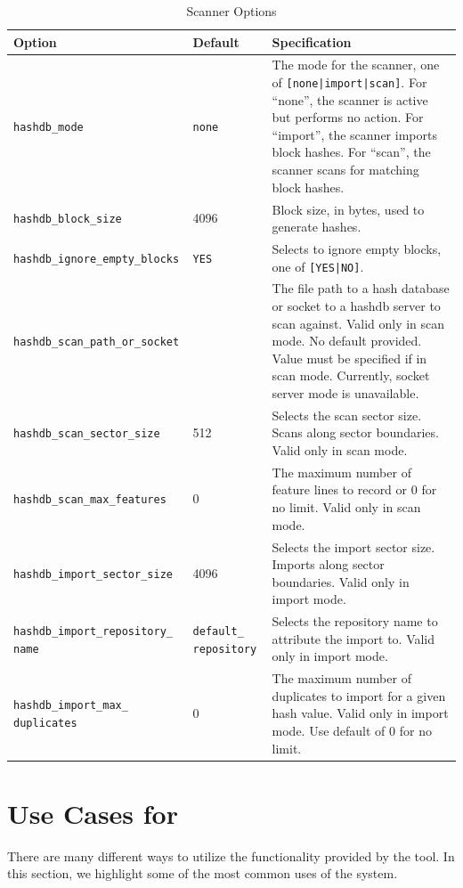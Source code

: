 \documentclass[11pt,fleqn]{article} %
\begin{document}
\begin{table}[!ht]

\centering
\caption{\bulk \hdb Scanner Options}
\label{tab:hashdbScannerUsage}
\begin{tabular}{|p{5 cm}|p{2.0 cm}|p{6.5 cm}|}
\hline \hline
\textbf{Option} & \textbf{Default} & \textbf{Specification} \\
\hline
\verb+hashdb_mode+ & \verb+none+ & The mode for the scanner, one of \verb+[none|import|scan]+. For ``none'', the scanner is active but performs no action. For ``import'', the scanner imports block hashes. For ``scan'', the scanner scans for matching block hashes.\\
\hline
\verb+hashdb_block_size+ &4096 & Block size, in bytes, used to generate hashes.\\
\hline
\verb+hashdb_ignore_empty_blocks+ & \verb+YES+ &Selects to ignore empty blocks,  one of \verb+[YES|NO]+.\\
\hline
\verb+hashdb_scan_path_or_socket+ & & The file path to a hash database or socket to a hashdb server to scan against.  Valid only in scan mode. No default provided. Value must be specified if in scan mode.  Currently, socket server mode is unavailable.\\
\hline
\verb+hashdb_scan_sector_size+ & 512 &Selects the scan sector size.  Scans along sector boundaries.  Valid only in scan mode.\\
\hline
\verb+hashdb_scan_max_features+ & 0 &The maximum number of feature lines to record or 0 for no limit.  Valid only in scan mode.\\
\hline
\verb+hashdb_import_sector_size+ & 4096 & Selects the import sector size.  Imports along sector boundaries.  Valid only in import mode.\\
\hline
\verb+hashdb_import_repository_+ \verb+name+ & \verb+default_+ \verb+repository+ &Selects the repository name to attribute the import to.  Valid only in import mode.\\
\hline
\verb+hashdb_import_max_+ \verb+duplicates+ & 0 &The maximum number of duplicates to import for a given hash value.  Valid only in import mode. Use default of 0 for no limit.\\
\hline
\end{tabular}
\end{table}

\section{Use Cases for \hash}
\label{UseCases}
There are many different ways to utilize the functionality provided by the \hash tool. In this section, we highlight some of the most common uses of the system.
\end{document}
